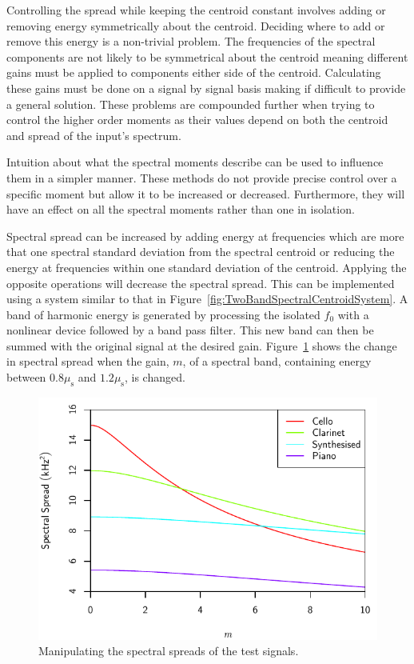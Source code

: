 			Controlling the spread while keeping the centroid constant involves adding or removing energy
			symmetrically about the centroid. Deciding where to add or remove this energy is a non-trivial
			problem. The frequencies of the spectral components are not likely to be symmetrical about the
			centroid meaning different gains must be applied to components either side of the centroid.
			Calculating these gains must be done on a signal by signal basis making if difficult to provide a
			general solution. These problems are compounded further when trying to control the higher order
			moments as their values depend on both the centroid and spread of the input's spectrum.

			Intuition about what the spectral moments describe can be used to influence them in a simpler
			manner. These methods do not provide precise control over a specific moment but allow it to be
			increased or decreased.  Furthermore, they will have an effect on all the spectral moments rather
			than one in isolation. 
			
			Spectral spread can be increased by adding energy at frequencies which are more that one spectral
			standard deviation from the spectral centroid or reducing the energy at frequencies within one
			standard deviation of the centroid. Applying the opposite operations will decrease the spectral
			spread. This can be implemented using a system similar to that in
			Figure~\ref{fig:TwoBandSpectralCentroidSystem}. A band of harmonic energy is generated by
			processing the isolated $f_{0}$ with a nonlinear device followed by a band pass filter. This new
			band can then be summed with the original signal at the desired gain. Figure~\ref{fig:MoveSpreads}
			shows the change in spectral spread when the gain, $m$, of a spectral band, containing energy
			between $0.8\mu_{\mathrm{s}}$ and $1.2\mu_{\mathrm{s}}$, is changed.

			\begin{figure}[h!]
				\centering
				\includegraphics{chapter6/Images/MoveSpreads.pdf}
				\caption{Manipulating the spectral spreads of the test signals.}
				\label{fig:MoveSpreads}
			\end{figure}

